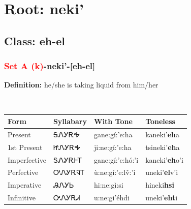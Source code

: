 \needspace{4in}
\section*{Root: neki'}
\nopagebreak
{}
\needspace{3in}
\subsection*{Class: eh-el}
\nopagebreak
\needspace{2in}
\subsubsection*{\textcolor{Red}{Set A (k)}{-}\textbf{neki'}{-}[eh-el]}
\nopagebreak
\textbf{Definition: } he/she is taking liquid from him/her
\\[0.5em]
\begin{tabularx}{\textwidth}{l X X X}%
\toprule%
\textbf{Form}&\textbf{Syllabary}&\textbf{With Tone}&\textbf{Toneless}\\%
\midrule%
Present&ᎦᏁᎩᎡᎭ&gane:gí:’e:ha&kaneki'\textbf{eh}a\\%
1st Present&ᏥᏁᎩᎡᎭ&ji:ne:gí:’e:ha&tsineki'\textbf{eh}a\\%
Imperfective&ᎦᏁᎩᎡᎰᎢ&gane:gí:’e:hó:’i&kaneki'\textbf{eh}o'i\\%
Perfective&ᎤᏁᎩᎡᎸᎢ&ù:ne:gí:’e:lv̌:’i&uneki'\textbf{el}v'i\\%
Imperative&ᎯᏁᎩᏏ&hi:ne:gì:si&hineki\textbf{hsi}\\%
Infinitive&ᎤᏁᎩᎡᏗ&u:ne:gi’éhdi&uneki'\textbf{eht}i\\%
\bottomrule%
\end{tabularx}
\\[1em]
